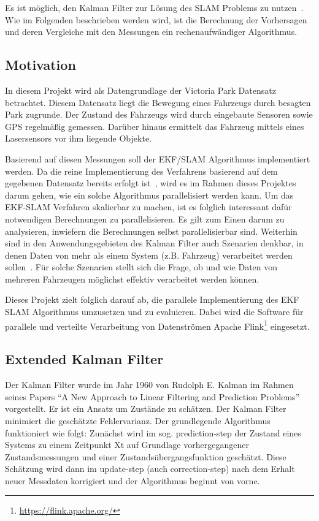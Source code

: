 \documentclass[11pt]{article}
\begin{document}
Es ist möglich, den Kalman Filter zur Lösung des  SLAM Problems zu nutzen~\cite{freiburg_SLAM}. Wie im Folgenden beschrieben werden wird, ist die Berechnung der Vorhersagen und deren Vergleiche mit den Messungen ein rech\-en\-auf\-wän\-di\-ger Algorithmus.

\subsection{Motivation}
In diesem Projekt wird als Datengrundlage der Victoria Park Datensatz betrachtet. Diesem Datensatz liegt die Bewegung eines Fahrzeugs durch besagten Park zugrunde. Der Zustand des Fahrzeugs wird durch eingebaute Sensoren sowie GPS regelmäßig gemessen. Darüber hinaus ermittelt das Fahrzeug mittels eines Lasersensors vor ihm liegende Objekte.

Basierend auf diesen Messungen soll der EKF/SLAM Algorithmus implementiert werden. Da die reine Implementierung des Verfahrens basierend auf dem gegebenen Datensatz bereits erfolgt ist~\cite{ute_SLAM}, wird es im Rahmen dieses Projektes darum gehen, wie ein solche Algorithmus parallelisiert werden kann. Um das EKF-SLAM Verfahren skalierbar zu machen, ist es folglich interessant dafür notwendigen Berechnungen zu parallelisieren. Es gilt zum Einen darum zu analysieren, inwiefern die Berechnungen selbst parallelisierbar sind. Weiterhin sind in den Anwendungsgebieten des Kalman Filter auch Szenarien denkbar, in denen Daten von mehr als einem System (z.B. Fahrzeug) verarbeitet werden sollen~\cite{vessel}. Für solche Szenarien stellt sich die Frage, ob  und wie Daten von mehreren Fahrzeugen möglichst effektiv verarbeitet werden können.

Dieses Projekt zielt folglich darauf ab, die parallele Implementierung des EKF SLAM Algorithmus umzusetzen und zu evaluieren. Dabei wird die Software für parallele und verteilte Verarbeitung von Datenströmen Apache Flink\footnote{\url{https://flink.apache.org/}} eingesetzt.

\subsection{Extended Kalman Filter}
Der Kalman Filter wurde im Jahr 1960 von Rudolph E. Kalman im Rahmen seines Papers “A New Approach to Linear Filtering and Prediction Problems”~\cite{kalman1960new} vorgestellt. Er ist ein Ansatz um Zustände zu schätzen. Der Kalman Filter minimiert die geschätzte Fehlervarianz. Der grundlegende Algorithmus funktioniert wie folgt: Zunächst wird im sog. prediction-step der Zustand eines Systems zu einem Zeitpunkt Xt auf Grundlage vorhergegangener Zustandsmessungen und einer Zustandsübergangsfunktion geschätzt. Diese Schätzung wird dann im update-step (auch correction-step) nach dem Erhalt neuer Messdaten korrigiert und der Algorithmus beginnt von vorne.
\end{document}
